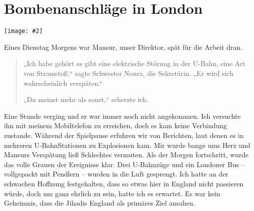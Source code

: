 \documentclass[12pt]{memoir}
\newcommand{\img}[3]{\begin{center}%
\texttt{[image: \#2]}\\{\small\em#3}%
\end{center}}
\begin{document}
\chapter{Bombenanschläge in London}

\img{scale=1.2}{London_Bombings.jpg}{}

Eines Dienstag Morgens war Mansur, unser Direktor, spät für die Arbeit dran.

\begin{quote}
„Ich habe gehört es gibt eine elektrische Störung in der U-Bahn,
eine Art von Stromstoß,“ sagte Schwester Noura, die Sekretärin.
„Er wird sich wahrscheinlich verspäten.“

„Du meinst mehr als sonst,“ scherzte ich.
\end{quote}

Eine Stunde verging und er war immer noch nicht angekommen.
Ich versuchte ihn mit meinem Mobiltelefon zu erreichen,
doch es kam keine Verbindung zustande.
Während der Spielpause erfuhren wir von Berichten,
laut denen es in mehreren U-Bahn\–Stationen zu Explosionen kam.
Mir wurde bange ums Herz und Mansurs Verspätung ließ Schlechtes vermuten.
Als der Morgen fortschritt, wurde das volle Grauen der Ereignisse klar.
Drei U-Bahnzüge und ein Londoner Bus –
vollgepackt mit Pendlern – wurden in die Luft gesprengt.
Ich hatte an der schwachen Hoffnung festgehalten,
dass so etwas hier in England nicht passieren würde,
doch um ganz ehrlich zu sein, hatte ich es erwartet.
Es war kein Geheimnis, dass die Jihadis England als primäres Ziel ansahen.
\end{document}
